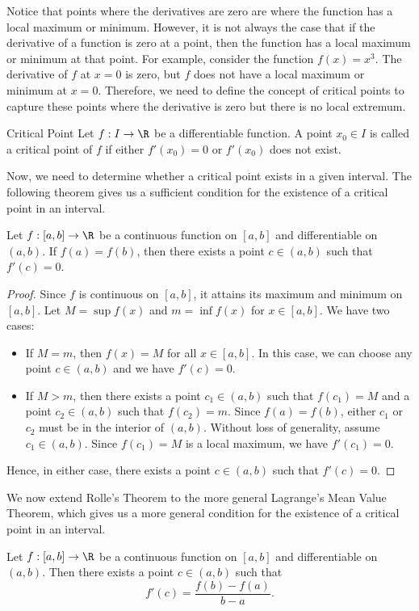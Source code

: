 \documentclass[openany]{book}
\begin{document}
Notice that points where the derivatives are zero are where the function has a local maximum or minimum. However, it is not always the case that if the derivative of a function is zero at a point, then the function has a local maximum or minimum at that point. For example, consider the function $f(x) = x^3$. The derivative of $f$ at $x = 0$ is zero, but $f$ does not have a local maximum or minimum at $x = 0$. Therefore, we need to define the concept of critical points to capture these points where the derivative is zero but there is no local extremum.
\begin{mydefinition}{Critical Point}
    Let $f: I \to \R$ be a differentiable function. A point $x_0 \in I$ is called a critical point of $f$ if either $f'(x_0) = 0$ or $f'(x_0)$ does not exist.
\end{mydefinition}
Now, we need to determine whether a critical point exists in a given interval. The following theorem gives us a sufficient condition for the existence of a critical point in an interval.
\begin{mytheorem}
    Let $f: [a, b] \to \R$ be a continuous function on $[a, b]$ and differentiable on $(a, b)$. If $f(a) = f(b)$, then there exists a point $c \in (a, b)$ such that $f'(c) = 0$.
\end{mytheorem}
\begin{proof}
    Since $f$ is continuous on $[a, b]$, it attains its maximum and minimum on $[a, b]$. Let $M = \sup f(x)$ and $m = \inf f(x)$ for $x \in [a, b]$. We have two cases:
\begin{itemize}
    \item If $M = m$, then $f(x) = M$ for all $x \in [a, b]$. In this case, we can choose any point $c \in (a, b)$ and we have $f'(c) = 0$.
    \item If $M > m$, then there exists a point $c_1 \in (a, b)$ such that $f(c_1) = M$ and a point $c_2 \in (a, b)$ such that $f(c_2) = m$. Since $f(a) = f(b)$, either $c_1$ or $c_2$ must be in the interior of $(a, b)$. Without loss of generality, assume $c_1 \in (a, b)$. Since $f(c_1) = M$ is a local maximum, we have $f'(c_1) = 0$.
\end{itemize}
Hence, in either case, there exists a point $c \in (a, b)$ such that $f'(c) = 0$.
\end{proof}
We now extend Rolle's Theorem to the more general Lagrange's Mean Value Theorem, which gives us a more general condition for the existence of a critical point in an interval.
\begin{mytheorem}
    Let $f: [a, b] \to \R$ be a continuous function on $[a, b]$ and differentiable on $(a, b)$. Then there exists a point $c \in (a, b)$ such that
    \[
        f'(c) = \frac{f(b) - f(a)}{b - a}.
    \]
\end{mytheorem}
\end{document}

